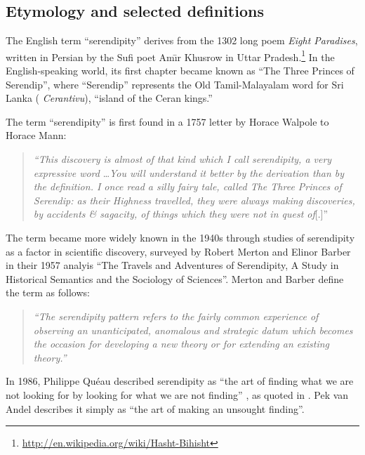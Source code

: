 
\subsection{Etymology and selected definitions} \label{sec:overview-serendipity}  \label{sec:literature-review}
The English term ``serendipity'' derives from the 1302 long poem \emph{Eight Paradises}, written in Persian by the Sufi poet Am\={\i}r Khusrow in Uttar Pradesh.\footnote{\url{http://en.wikipedia.org/wiki/Hasht-Bihisht}}  In the English-speaking world, its first chapter became known as ``The Three Princes of Serendip'', where ``Serendip'' represents the Old Tamil-Malayalam word for Sri Lanka (%
\emph{Cerantivu}), ``island of the Ceran kings.''

The term ``serendipity'' is first found in a 1757 letter by Horace Walpole to Horace Mann:
\begin{quote}
\emph{``This discovery is almost of that kind which I call serendipity, a very expressive
word} \ldots \emph{You will understand it better by the derivation than by the
definition. I once read a silly fairy tale, called The Three Princes of Serendip:
as their Highness travelled, they were always making discoveries, by accidents
\& sagacity, of things which they were not in quest of}[.]''~\cite[p. 633]{van1994anatomy}
\end{quote}
The term became more widely known in the 1940s through studies of serendipity as a factor in scientific discovery, surveyed by Robert Merton and Elinor Barber \citeyear{merton} in their 1957 analyis ``The Travels and Adventures of Serendipity, A Study in Historical Semantics and the Sociology of Sciences''.  Merton and Barber define the term as follows:
\begin{quote}
\emph{``The serendipity pattern refers to the fairly common experience of observing
an unanticipated, anomalous and strategic datum which becomes the occasion
for developing a new theory or for extending an existing theory.''} \cite[p. 635]{van1994anatomy}
\end{quote}
In 1986, Philippe Qu\'eau described serendipity as ``the art of
finding what we are not looking for by looking for what we are not
finding'' \cite{eloge-de-la-simulation}, as quoted in
\cite[p. 121]{Campos2002}.  Pek van Andel
\citeyear[p. 631]{van1994anatomy} describes it simply as ``the art of
making an unsought finding''.


